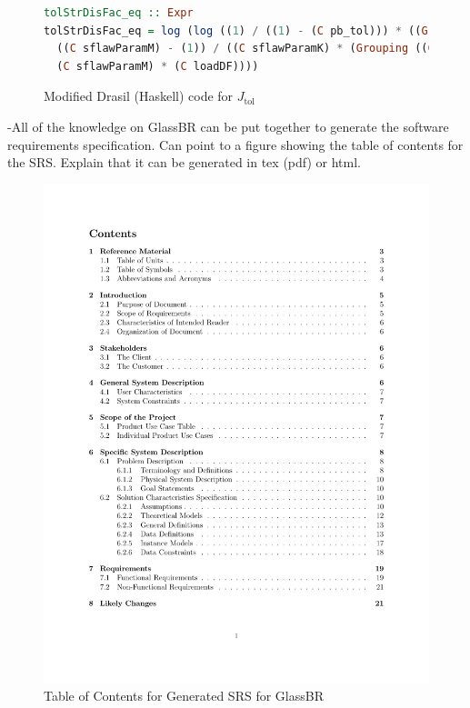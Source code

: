 \documentclass[sigconf]{acmart}
\newcommand{\jtol}{$J_{\mbox{tol}}$}
\begin{document}
\begin{figure}
\begin{lstlisting}[language=Haskell, frame=single, showstringspaces=false, 
basicstyle=\small]
tolStrDisFac_eq :: Expr
tolStrDisFac_eq = log (log ((1) / ((1) - (C pb_tol))) * ((Grouping ((C plate_len) * (C plate_width))) :^
  ((C sflawParamM) - (1)) / ((C sflawParamK) * (Grouping ((C mod_elas) * (square (C act_thick)))) :^ 
  (C sflawParamM) * (C loadDF))))
\end{lstlisting}
\caption{Modified Drasil (Haskell) code for \jtol{}}
\label{Fig_JtolDrasil_fix}
\end{figure}

-All of the knowledge on GlassBR can be put together to generate the software
requirements specification.  Can point to a figure showing the table of contents
for the SRS.  Explain that it can be generated in tex (pdf) or html.

\begin{figure}[htpb]
\begin{center}
\includegraphics[scale=0.45]{./figures/TofC.pdf}
\end{center}
\caption{Table of Contents for Generated SRS for GlassBR}
\label{Fig_ToCGlassBRSRS}
\end{figure}
\end{document}
